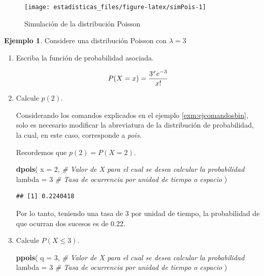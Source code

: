 \documentclass[
  11pt,
]{book}
\newenvironment{Shaded}{\begin{snugshade}}{\end{snugshade}}
\newcommand{\AttributeTok}[1]{\textcolor[rgb]{0.13,0.29,0.53}{#1}}
\newcommand{\CommentTok}[1]{\textcolor[rgb]{0.56,0.35,0.01}{\textit{#1}}}
\newcommand{\DecValTok}[1]{\textcolor[rgb]{0.00,0.00,0.81}{#1}}
\newcommand{\FunctionTok}[1]{\textcolor[rgb]{0.13,0.29,0.53}{\textbf{#1}}}
\newcommand{\NormalTok}[1]{#1}
\theoremstyle{definition}
\theoremstyle{definition}
\newtheorem{example}{Ejemplo}[chapter]
\theoremstyle{definition}
\theoremstyle{definition}
\theoremstyle{remark}
\begin{document}
\begin{figure}

{\centering \texttt{[image: estadisticas\_files/figure-latex/simPois-1]} 

}

\caption{Simulación de la distribución Poisson}\label{fig:simPois}
\end{figure}

\begin{example}

Considere una distribución Poisson con \(\lambda = 3\)

\begin{enumerate}
\def\labelenumi{\alph{enumi}.}
\item
  Escriba la función de probabilidad asociada.

  \begin{equation}
  \notag
  P(X=x) = \dfrac{3^xe^{-3}}{x!}
  \end{equation}
\item
  Calcule \(p(2)\).

  Considerando los comandos explicados en el ejemplo \ref{exm:ejcomandosbin}, solo es necesario modificar la abreviatura de la distribución de probabilidad, la cual, en este caso, corresponde a \emph{pois}.

  Recordemos que \(p(2) = P(X = 2)\).

\begin{Shaded}
\begin{Highlighting}[]
\FunctionTok{dpois}\NormalTok{(}
  \AttributeTok{x =} \DecValTok{2}\NormalTok{, }\CommentTok{\# Valor de X para el cual se desea calcular la probabilidad}
  \AttributeTok{lambda =} \DecValTok{3} \CommentTok{\# Tasa de ocurrencia por unidad de tiempo o espacio}
\NormalTok{  )}
\end{Highlighting}
\end{Shaded}

\begin{verbatim}
## [1] 0.2240418
\end{verbatim}

  Por lo tanto, teniendo una tasa de 3 por unidad de tiempo, la probabilidad de que ocurran dos sucesos es de 0.22.
\item
  Calcule \(P(X\leq 3)\).

\begin{Shaded}
\begin{Highlighting}[]
\FunctionTok{ppois}\NormalTok{(}
  \AttributeTok{q =} \DecValTok{3}\NormalTok{, }\CommentTok{\# Valor de X para el cual se desea calcular la probabilidad}
  \AttributeTok{lambda =} \DecValTok{3} \CommentTok{\# Tasa de ocurrencia por unidad de tiempo o espacio}
\NormalTok{  )}
\end{Highlighting}
\end{Shaded}


\end{enumerate}
\end{example}
\end{document}

